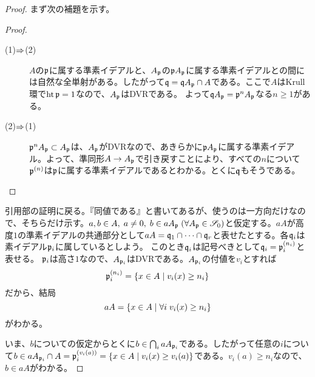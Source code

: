 \begin{proof}
  まず次の補題を示す。
  \begin{proof} ${}$
    \begin{description}
      \item[(1)$\Rightarrow$(2)] $A$の$\mathfrak{p}$に属する準素イデアルと、$A_{\mathfrak{p}}$の$\mathfrak{p} A_{\mathfrak{p}}$に属する準素イデアルとの間には自然な全単射がある。したがって$\mathfrak{q} = \mathfrak{q} A_{\mathfrak{p}} \cap A$である。ここで$A$はKrull環で$\operatorname{ht} \mathfrak{p} = 1$なので、$A_{\mathfrak{p}}$はDVRである。
      よって$\mathfrak{q} A_{\mathfrak{p}}= \mathfrak{p}^n A_{\mathfrak{p}}$なる$n \geq 1$がある。
      \item[(2)$\Rightarrow$(1)] $\mathfrak{p}^n A_{\mathfrak{p}} \subset A_{\mathfrak{p}}$は、$A_{\mathfrak{p}}$がDVRなので、あきらかに$\mathfrak{p} A_{\mathfrak{p}}$に属する準素イデアル。よって、準同形$A \to A_{\mathfrak{p}}$で引き戻すことにより、すべての$n$について$\mathfrak{p}^{(n)}$は$\mathfrak{p}$に属する準素イデアルであるとわかる。とくに$\mathfrak{q}$もそうである。
    \end{description}
  \end{proof}
  引用部の証明に戻る。『同値である』と書いてあるが、使うのは一方向だけなので、そちらだけ示す。$a,b \in A, \; a \neq 0, \; b \in a A_{\mathfrak{p}} \; (\forall A_{\mathfrak{p}} \in \mathscr{S}_0)$と仮定する。$aA$が高度$1$の準素イデアルの共通部分として$aA = \mathfrak{q}_1 \cap \cdots \cap \mathfrak{q}_r$と表せたとする。各$\mathfrak{q}_i$は素イデアル$\mathfrak{p}_i$に属しているとしよう。
  このとき$\mathfrak{q}_i$は記号べきとして$\mathfrak{q}_i = \mathfrak{p}_i^{(n_i)}$と表せる。
  $\mathfrak{p}_i$は高さ$1$なので、$A_{\mathfrak{p}_i}$はDVRである。$A_{\mathfrak{p}_i}$の付値を$v_i$とすれば
  \[
\mathfrak{p}_i^{(n_i)} = \left\{ x \in A \mathrel{} \middle| \mathrel{}  v_i(x) \geq n_i  \right\}
  \]
  だから、結局
  \[
  aA = \left\{ x \in A \mathrel{} \middle| \mathrel{}  \forall i \; v_i(x) \geq n_i \right\}
  \]
  がわかる。

  いま、$b$についての仮定からとくに$b \in \bigcap_{i} a A_{\mathfrak{p}_i}$である。したがって任意の$i$について$b \in a A_{\mathfrak{p}_i} \cap A = \mathfrak{p}_i^{(v_i(a))} = \left\{ x \in A \mathrel{} \middle| \mathrel{} v_i(x) \geq v_i(a) \right\}$である。$v_i(a) \geq n_i$なので、$b \in aA$がわかる。
\end{proof}


